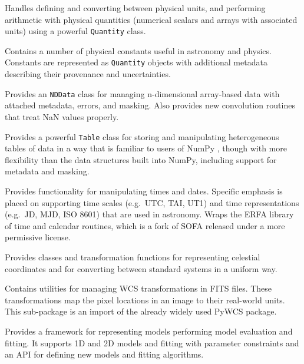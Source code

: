 \documentclass[11pt,twoside]{article}
\begin{document}
Handles defining and converting between physical units, and performing
arithmetic with physical quantities (numerical scalars and arrays with
associated units) using a powerful \texttt{Quantity} class.


Contains a number of physical constants useful in astronomy and physics.
Constants are represented as \texttt{Quantity} objects with additional metadata
describing their provenance and uncertainties.


Provides an \texttt{NDData} class for managing n-dimensional array-based data
with attached metadata, errors, and masking.  Also provides new convolution
routines that treat NaN values properly.


Provides a powerful \texttt{Table} class for storing and manipulating
heterogeneous tables of data in a way that is familiar to users of NumPy
\citep{oliphant2006guide,van2011numpy}, though with more flexibility than the
data structures built into NumPy, including support for metadata and masking.

Provides functionality for manipulating times and dates.  Specific emphasis is
placed on supporting time scales (e.g.~UTC, TAI, UT1) and time representations
(e.g.~JD, MJD, ISO 8601) that are used in astronomy.  Wraps the ERFA library of
time and calendar routines, which is a fork of SOFA \citep{sofa_wallace}
released under a more permissive license.


Provides classes and transformation functions for representing celestial
coordinates and for converting between standard systems in a uniform way.


Contains utilities for managing WCS transformations in FITS files.  These
transformations map the pixel locations in an image to their real-world units.
This sub-package is an import of the already widely used PyWCS package.


Provides a framework for representing models performing model evaluation and
fitting.  It supports 1D and 2D models and fitting with parameter constraints
and an API for defining new models and fitting algorithms.
\end{document}
